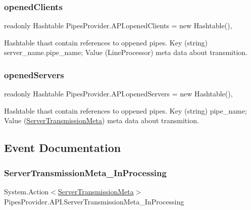 \subsubsection{\texorpdfstring{opened\+Clients}{openedClients}}
{\footnotesize\ttfamily readonly Hashtable Pipes\+Provider.\+A\+P\+I.\+opened\+Clients = new Hashtable()\hspace{0.3cm}{\ttfamily [static]}, {\ttfamily [private]}}



Hashtable thast contain references to oppened pipes. Key (string) server\+\_\+name.\+pipe\+\_\+name; Value (Line\+Processor) meta data about transmition. 

\mbox{\label{class_pipes_provider_1_1_a_p_i_ae5d6ee8740cc704d7ac5fc619349b603}} 
\subsubsection{\texorpdfstring{opened\+Servers}{openedServers}}
{\footnotesize\ttfamily readonly Hashtable Pipes\+Provider.\+A\+P\+I.\+opened\+Servers = new Hashtable()\hspace{0.3cm}{\ttfamily [static]}, {\ttfamily [private]}}



Hashtable thast contain references to oppened pipes. Key (string) pipe\+\_\+name; Value (\mbox{\hyperlink{class_pipes_provider_1_1_server_transmission_meta}{Server\+Transmission\+Meta}}) meta data about transmition. 



\subsection{Event Documentation}
\mbox{\label{class_pipes_provider_1_1_a_p_i_a88d536e98d1ea1c34d4331fef67a7561}} 
\subsubsection{\texorpdfstring{Server\+Transmission\+Meta\+\_\+\+In\+Processing}{ServerTransmissionMeta\_InProcessing}}
{\footnotesize\ttfamily System.\+Action$<$\mbox{\hyperlink{class_pipes_provider_1_1_server_transmission_meta}{Server\+Transmission\+Meta}}$>$ Pipes\+Provider.\+A\+P\+I.\+Server\+Transmission\+Meta\+\_\+\+In\+Processing\hspace{0.3cm}{\ttfamily [static]}}



